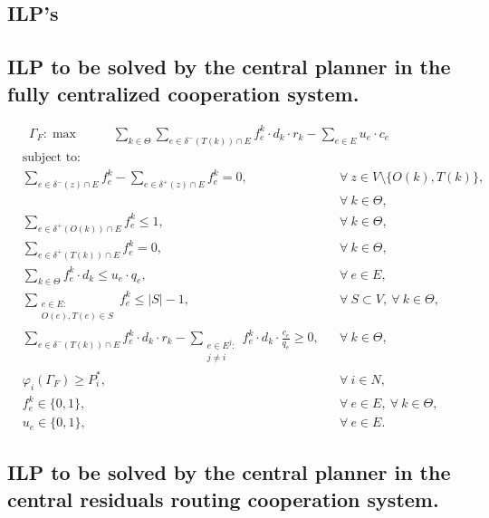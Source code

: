 \documentclass{article}
\begin{document}
\begin{appendices}
\section{ILP's}

\subsection{ILP to be solved by the central planner in the fully centralized cooperation system.}
\label{seq:appendixilpfull}
    \begin{align}
        &  \Gamma_F: \max  & \hspace{22pt} \sum_{k\in \Theta} \sum_{e \in \delta^-(T(k))\cap E}  f_e^k \cdot d_k \cdot r_k - \sum_{e\in E} u_{e}\cdot c_{e} \hspace{40pt} && 
    \end{align}
    \begin{align}
        & \text{subject to:}       && \nonumber \\
        & \sum_{e \in \delta^-(z)\cap E} f_e^k -\sum_{e \in \delta^+(z)\cap E} f_{e}^k = 0,\quad && \forall\ z\in V\setminus\{O(k),T(k)\},\nonumber\\
        & && \forall\ k\in\Theta, \\
& \sum_{e \in \delta^+(O(k))\cap E} f_e^k \leq 1, && \forall\ k\in \Theta, \\
 & \sum_{e \in \delta^+(T(k))\cap E} f_e^k = 0,  && \forall\ k\in \Theta,  \\
& \sum_{k \in \Theta} f_e^k\cdot d_k  \leq u_e\cdot q_e, && \forall\ e \in E,   \\
 & \sum_{\substack{e \in E\colon \\ O(e),T(e) \in S}} f_e^k \leq |S| -1, && \forall\ S \subset V,\ \forall\ k \in \Theta,\\
&\sum_{e \in \delta^-(T(k))\cap E}  f_e^k  \cdot d_k \cdot r_k - \sum_{\substack{e \in E^j\colon \\ j\not = i}} f_e^k \cdot d_k \cdot \frac{c_e}{q_e}\geq 0, && \forall\ k \in \Theta, \\
& \varphi_i(\Gamma_F) \geq P_i^*,  && \forall\ i\in N, \\
& f_e^k \in \{0,1\},  && \forall\ e \in E,\ \forall\ k \in \Theta,  \\
&  u_e  \in \{0,1\},  && \forall\ e \in E.
   \end{align}

\subsection{ILP to be solved by the central planner in the central  residuals routing cooperation system.}
\label{seq:appendixilpresidual}


\end{appendices}
\end{document}
